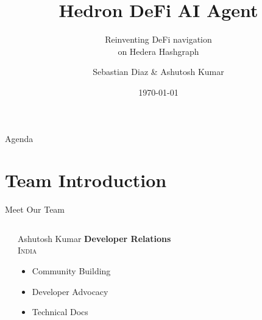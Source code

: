 \documentclass[aspectratio=169]{beamer}
\title{Hedron DeFi AI Agent}
\subtitle{Reinventing DeFi navigation \\ on Hedera Hashgraph}
\author{Sebastian Diaz \& Ashutosh Kumar}
\institute{Hello Future Hackathon}
\date{\today}
\begin{document}
\begin{frame}
\titlepage
\end{frame}

\begin{frame}{Agenda}
\tableofcontents
\end{frame}

\section{Team Introduction}

\begin{frame}{Meet Our Team}
\vspace{0.05cm}
\begin{columns}[c]
\begin{center}
\end{center}

\vspace{0.05cm}

\begin{block}{Ashutosh Kumar}
\centering
\vspace{0.05cm}
\textbf{\normalsize \color{secondary}Developer Relations} \\
\vspace{0.05cm}
\textsc{\normalsize India} \\
\vspace{0.05cm}
\begin{itemize}
\setlength\itemsep{0em}
\setlength\leftmargin{1em}
\item Community Building
\item Developer Advocacy  
\item Technical Docs
\end{itemize}
\vspace{0.05cm}
\end{block}


\begin{center}
\end{center}


\end{columns}
\end{frame}
\end{document}
